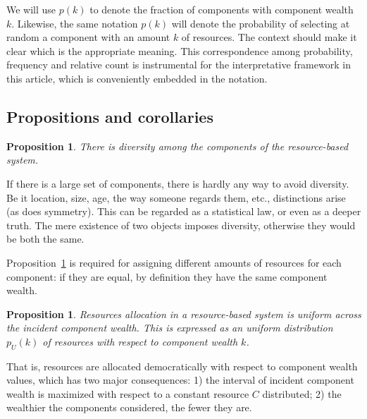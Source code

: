 \documentclass[a4paper, 11pt]{article} %
\newtheorem{proposition}[theorem]{Proposition}
\begin{document}
We will use $p(k)$ to denote the fraction of components with component wealth $k$. Likewise, the same notation $p(k)$ will denote the probability of selecting at random a component with an amount $k$ of resources.
The context should make it clear which is the appropriate meaning.
This correspondence among probability, frequency and relative count is
instrumental for the interpretative framework in this article,
which is conveniently embedded in the notation.



\subsection{Propositions and corollaries}

\setcounter{theorem}{-1}
\begin{proposition}\label{prop:0}
	There is diversity among the components of the resource-based system.
\end{proposition}

If there is a large set of components, there is hardly any way to avoid diversity. Be it location, size, age, the way someone regards them, etc., distinctions arise (as does symmetry). This can be regarded as a statistical law, or even as a deeper truth.
The mere existence of two objects imposes diversity, otherwise they would be both the same.

Proposition~\ref{prop:0} is required for assigning different amounts of resources for each component: if they are equal, by definition they have the same component wealth.

\begin{proposition}\label{prop:2}
	Resources allocation in a resource-based system is uniform across the incident component wealth. This is expressed as an uniform distribution $p_U(k)$ of resources with respect to component wealth $k$.
\end{proposition}

That is, resources are allocated democratically with respect to component wealth values, which has two major consequences: 1) the interval of incident component wealth is maximized with respect to a constant resource $C$ distributed; 
2) the wealthier the components considered, the fewer they are. 
\end{document}
